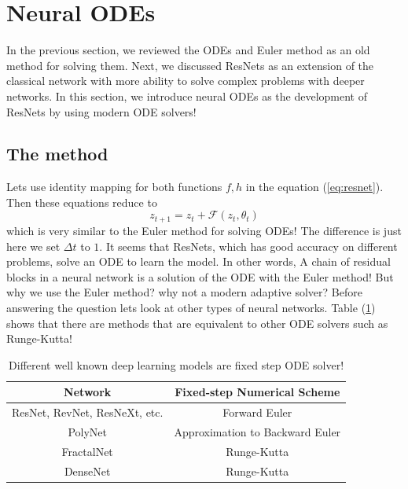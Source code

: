 \documentclass{article}
\newcommand\pef[1]{(\ref{#1})}
\begin{document}
	
	
	
	
	\section{Neural ODEs}
	In the previous section, we reviewed the ODEs and Euler method as an old method for solving them. Next, we discussed ResNets as an extension of the classical network with more ability to solve complex problems with deeper networks. In this section, we introduce neural ODEs as the development of ResNets by using modern ODE solvers! 
	\\
	\subsection{The method}
	Lets use identity mapping for both functions $f,h$ in the equation \pef{eq:resnet}. Then these equations reduce to
	\begin{equation}
	z_{t+1} = z_t + \mathcal{F}(z_t, \theta_t)
	\end{equation}
	which is very similar to the Euler method for solving ODEs! The difference is just here we set $\Delta t$ to $1$. It seems that ResNets, which has good accuracy on different problems, solve an ODE to learn the model. In other words, A chain of residual blocks in a neural network is a solution of the ODE with the Euler method! But why we use the Euler method? why not a modern adaptive solver? Before answering the question lets look at other types of neural networks. Table \pef{tbl:models} shows that there are methods that are equivalent to other ODE solvers such as Runge-Kutta!
	\begin{table}
		\centering
		\begin{tabular*}{.9\linewidth}{@{\extracolsep{\fill} }cc@{}}
			\toprule
			Network                       & Fixed-step Numerical Scheme     \\ \midrule
			ResNet, RevNet, ResNeXt, etc. & Forward Euler                   \\
			PolyNet                       & Approximation to Backward Euler \\
			FractalNet                    & Runge-Kutta                     \\
			DenseNet                      & Runge-Kutta                     \\ \bottomrule
		\end{tabular*}
		\caption{Different well known deep learning models are fixed step ODE solver!}
		\label{tbl:models}
	\end{table}
	\\
	
\end{document}
